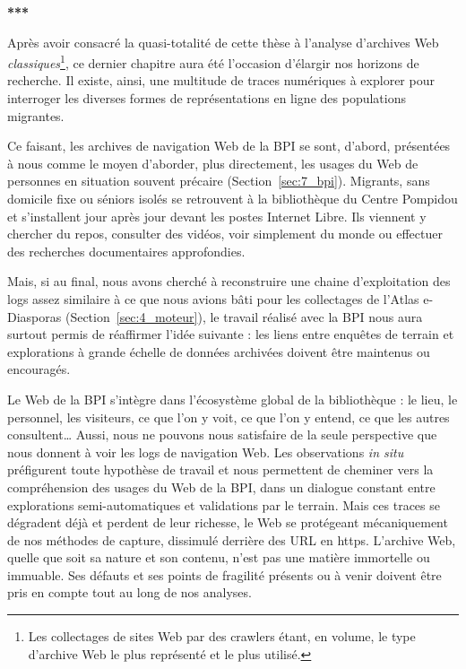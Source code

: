 \documentclass[symmetric,justified,marginals=raggedouter]{tufte-book}
\begin{document}
\begin{center}
	\textbf{***}
\end{center}

\noindent Après avoir consacré la quasi-totalité de cette thèse à l'analyse d'archives Web \textit{classiques}\footnote{\RaggedOuter Les collectages de sites Web par des crawlers étant, en volume, le type d'archive Web le plus représenté et le plus utilisé.}, ce dernier chapitre aura été l'occasion d'élar\-gir nos horizons de recherche. Il existe, ainsi, une multitude de traces numériques à explorer pour interroger les diverses formes de représentations en ligne des populations migrantes.  

Ce faisant, les archives de navigation Web de la BPI se sont, d'abord, présentées à nous comme le moyen d'aborder, plus directement, les usages du Web de personnes en situation souvent précaire (Section~\ref{sec:7_bpi}). Migrants, sans domicile fixe ou séniors isolés se retrouvent à la bibliothèque du Centre Pompidou et s'installent jour après jour devant les postes Internet Libre. Ils viennent y chercher du repos, consulter des vidéos, voir simplement du monde ou effectuer des recherches documentaires approfondies. 

Mais, si au final, nous avons cherché à reconstruire une chaine d'exploitation des logs assez similaire à ce que nous avions bâti pour les collectages de l'Atlas e-Diasporas (Section~\ref{sec:4_moteur}), le travail réalisé avec la BPI nous aura surtout permis de réaffirmer l'idée suivante : les liens entre enquêtes de terrain et explorations à grande échelle de données archivées doivent être maintenus ou encouragés. 

Le Web de la BPI s'intègre dans l'écosystème global de la bibliothèque : le lieu, le personnel, les visiteurs, ce que l'on y voit, ce que l'on y entend, ce que les autres consultent\ldots{} Aussi, nous ne pouvons nous satisfaire de la seule perspective que nous donnent à voir les logs de navigation Web. Les observations \textit{in situ} préfigurent toute hypothèse de travail et nous permettent de cheminer vers la compréhension des usages du Web de la BPI, dans un dialogue constant entre explorations semi-automatiques et validations par le terrain. Mais ces traces se dégradent déjà et perdent de leur richesse, le Web se protégeant mécaniquement de nos méthodes de capture, dissimulé derrière des URL en https. L'archive Web, quelle que soit sa nature et son contenu, n'est pas une matière immortelle ou immuable. Ses défauts et ses points de fragilité présents ou à venir doivent être pris en compte tout au long de nos analyses.
\end{document}
